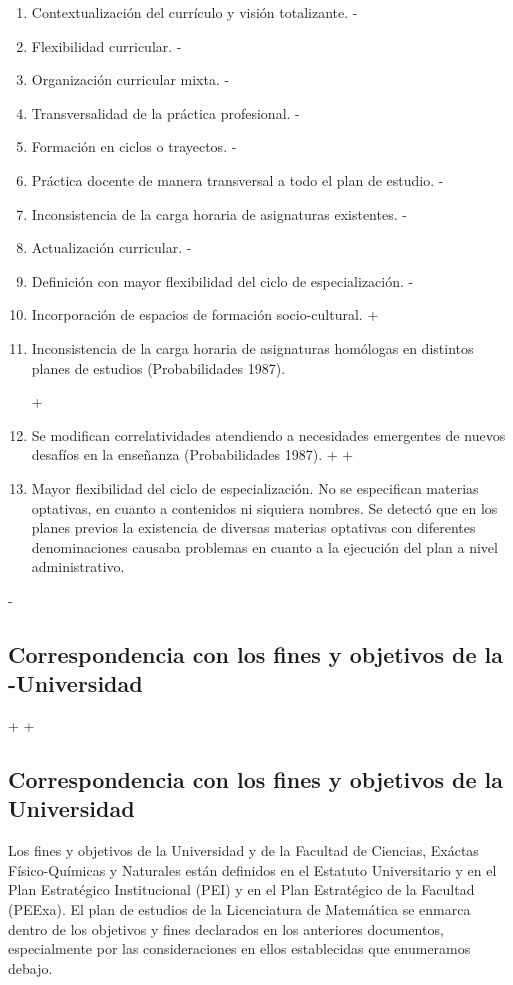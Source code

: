  \begin{enumerate}
-\item Contextualización del currículo y visión totalizante.
-\item Flexibilidad curricular.
-\item Organización curricular mixta.
-\item Transversalidad de la práctica profesional.
-\item Formación en ciclos o trayectos.
-\item Práctica docente de manera transversal a todo el plan de estudio.
-\item Inconsistencia de la carga horaria de asignaturas existentes.
-\item Actualización curricular.
-\item Definición con mayor flexibilidad del ciclo de especialización.
-\item Incorporación de espacios de formación socio-cultural.
+\item Inconsistencia de la carga horaria de asignaturas homólogas en distintos planes de estudios (Probabilidades 1987).
 
+\item Se modifican correlatividades atendiendo a necesidades emergentes de nuevos desafíos en la enseñanza (Probabilidades 1987). 
+
+\item Mayor flexibilidad del ciclo de especialización. No se especifican materias optativas, en cuanto a contenidos ni siquiera nombres. Se detectó que en los planes previos la existencia de diversas materias optativas con diferentes denominaciones causaba problemas en cuanto a la ejecución del plan a nivel administrativo.  
 \end{enumerate}
 
-\subsection{Correspondencia con los fines y objetivos de la
-Universidad} 
+
+\subsection{Correspondencia con los fines y objetivos de la Universidad}
 
 Los fines y objetivos de la Universidad y de la Facultad de Ciencias, Exáctas Físico-Químicas y Naturales están definidos en el Estatuto Universitario y en el Plan Estratégico Institucional (PEI) y en el Plan Estratégico  de la Facultad (PEExa). El plan de estudios de la Licenciatura de Matemática se enmarca dentro de los objetivos y fines declarados en los anteriores documentos, especialmente por las consideraciones en ellos establecidas  que enumeramos debajo. 
 
